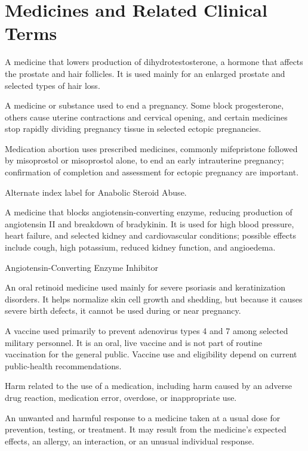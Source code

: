\section*{Medicines and Related Clinical Terms}
 A medicine that lowers production of dihydrotestosterone, a hormone that affects the prostate and hair follicles. It is used mainly for an enlarged prostate and selected types of hair loss.

 A medicine or substance used to end a pregnancy. Some block progesterone, others cause uterine contractions and cervical opening, and certain medicines stop rapidly dividing pregnancy tissue in selected ectopic pregnancies.

 Medication abortion uses prescribed medicines, commonly mifepristone followed by misoprostol or misoprostol alone, to end an early intrauterine pregnancy; confirmation of completion and assessment for ectopic pregnancy are important.

 Alternate index label for Anabolic Steroid Abuse.

 A medicine that blocks angiotensin-converting enzyme, reducing production of angiotensin II and breakdown of bradykinin. It is used for high blood pressure, heart failure, and selected kidney and cardiovascular conditions; possible effects include cough, high potassium, reduced kidney function, and angioedema.

\synonyms
Angiotensin-Converting Enzyme Inhibitor

 An oral retinoid medicine used mainly for severe psoriasis and keratinization disorders. It helps normalize skin cell growth and shedding, but because it causes severe birth defects, it cannot be used during or near pregnancy.

 A vaccine used primarily to prevent adenovirus types 4 and 7 among selected
military personnel. It is an oral, live vaccine and is not part of routine vaccination for the general
public. Vaccine use and eligibility depend on current public-health recommendations.

 Harm related to the use of a medication, including harm caused by an adverse drug reaction, medication error,
overdose, or inappropriate use.

 An unwanted and harmful response to a medicine taken at a usual dose for prevention, testing, or treatment. It may result from the medicine’s expected effects, an allergy, an interaction, or an unusual individual response.

